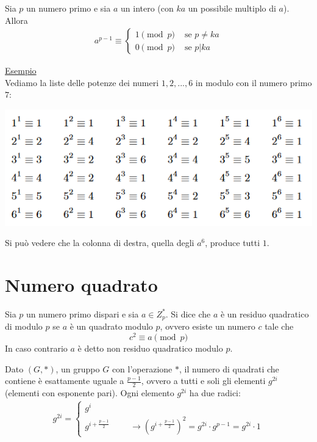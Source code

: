 \begin{theorem}
    Sia \(p\) un numero primo e sia \(a\) un intero (con \(ka\) un possibile multiplo di $a$). Allora
    \begin{align*}
        a^{p-1} \equiv 
        \begin{cases}
                1 \pmod p & \text{ se } p \ne ka\\
                0 \pmod p & \text{ se } p \big| ka
        \end{cases}
    \end{align*}
\end{theorem}

\noindent \underline{Esempio}\\

\noindent Vediamo la liste delle potenze dei numeri $1, 2, ..., 6$ in modulo con il numero primo $7$:

\begin{center}
     \includegraphics[width=1\textwidth]{images/6.png}
\end{center}

\noindent Si può vedere che la colonna di destra, quella degli $a^{6}$, produce tutti $1$.

\section{Numero quadrato}

\begin{definition}
Sia \(p\) un numero primo dispari e sia $a \in Z^*_p$. Si dice che \(a\) è un residuo quadratico di modulo \(p\) se \(a\) è un quadrato modulo \(p\), ovvero esiste un numero \(c\) tale che \[c^2 \equiv a \pmod p\]
In caso contrario \(a\) è detto non residuo quadratico modulo \(p\).
\end{definition}

\noindent Dato $(G, *)$, un gruppo $G$ con l'operazione $*$, il numero di quadrati che contiene è esattamente uguale a $\frac{p-1}{2}$, ovvero a tutti e soli gli elementi $g^{2i}$ (elementi con esponente pari). Ogni elemento $g^{2i}$ ha due radici:
\begin{align*}
 	g^{2i}=
 	    \begin{cases}
 	   g^i \\ 
 	    g^{i+\frac{p-1}{2}} \hspace{1cm} \rightarrow (g^{i+\frac{p-1}{2}})^2 = g^{2i}\cdot g^{p-1} = g^{2i}\cdot 1
        \end{cases} 
\end{align*}

